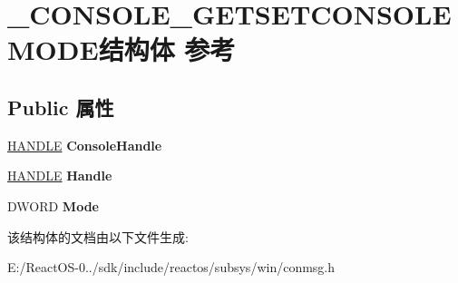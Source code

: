 \hypertarget{struct___c_o_n_s_o_l_e___g_e_t_s_e_t_c_o_n_s_o_l_e_m_o_d_e}{}\section{\+\_\+\+C\+O\+N\+S\+O\+L\+E\+\_\+\+G\+E\+T\+S\+E\+T\+C\+O\+N\+S\+O\+L\+E\+M\+O\+D\+E结构体 参考}
\label{struct___c_o_n_s_o_l_e___g_e_t_s_e_t_c_o_n_s_o_l_e_m_o_d_e}
\subsection*{Public 属性}
\begin{DoxyCompactItemize}
\item 
\mbox{\label{struct___c_o_n_s_o_l_e___g_e_t_s_e_t_c_o_n_s_o_l_e_m_o_d_e_adf49c60075b5e7c73901ce998ab0ebe4}} 
\hyperlink{interfacevoid}{H\+A\+N\+D\+LE} {\bfseries Console\+Handle}
\item 
\mbox{\label{struct___c_o_n_s_o_l_e___g_e_t_s_e_t_c_o_n_s_o_l_e_m_o_d_e_a5be170c2b5d476ca890ec02baea4a865}} 
\hyperlink{interfacevoid}{H\+A\+N\+D\+LE} {\bfseries Handle}
\item 
\mbox{\label{struct___c_o_n_s_o_l_e___g_e_t_s_e_t_c_o_n_s_o_l_e_m_o_d_e_a84226988fa0e2ac167a88dd0d6dc0ec5}} 
D\+W\+O\+RD {\bfseries Mode}
\end{DoxyCompactItemize}


该结构体的文档由以下文件生成\+:\begin{DoxyCompactItemize}
\item 
E\+:/\+React\+O\+S-\/0../sdk/include/reactos/subsys/win/conmsg.\+h\end{DoxyCompactItemize}
